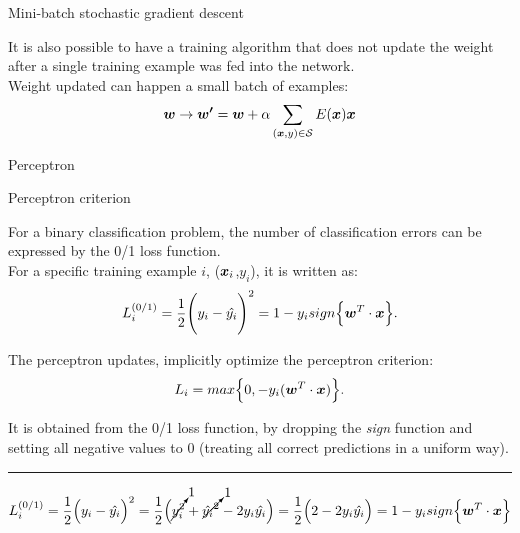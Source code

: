 \begin{frame}[t]{Mini-batch stochastic gradient descent}

    It is also possible to have a training algorithm that does not 
    update the weight after a single training example was fed into the network.\\

    Weight updated can happen a small batch of examples:
    \begin{equation}
        \boldsymbol{w} \rightarrow \boldsymbol{w^\prime} = 
          \boldsymbol{w} + \alpha \sum_{(\boldsymbol{x},y) \in \mathcal{S}} E(\boldsymbol{x}) \boldsymbol{x}
        \label{eq:percepton_weight_update_minibatch_1}
      \end{equation}

\end{frame}

%
%
%

\begin{frame}[t]{Perceptron}


\end{frame}

%
%
%

\begin{frame}[t]{Perceptron criterion}

    For a binary classification problem, 
    the number of classification errors can be expressed by the
    \gls{0/1 loss function}.\\
    \vspace{0.3cm}
    For a specific training example $i$, 
    ($\boldsymbol{x}_i$,$y_i$), it is written as:
    \begin{equation}
        L_{i}^{(0/1)} = 
          \frac{1}{2} \Bigg( y_i - \hat{y_i} \Bigg)^2 =
          1 - y_i sign\Big\{ \boldsymbol{w}^T \cdot \boldsymbol{x} \Big\}.
        \label{eq:percepton_01_loss_1}  
    \end{equation}

    The \gls{perceptron} updates, 
    implicitly optimize the \gls{perceptron criterion}:
    \begin{equation}
        L_{i} = 
          max\Big\{0, - y_i(\boldsymbol{w}^T \cdot \boldsymbol{x}) \Big\}.
        \label{eq:percepton_criterion_1}  
    \end{equation}

    It is obtained from the \gls{0/1 loss function}, 
    by dropping the {\em sign} function and setting all negative values to 0
    (treating all correct predictions in a uniform way).

    \noindent\rule{4cm}{0.4pt}
    {\scriptsize
        \begin{equation*}
            L_{i}^{(0/1)} = 
            \frac{1}{2} \Big( y_i - \hat{y_i} \Big)^2 =
            \frac{1}{2} \Big( \cancelto{1}{y_i^2} + \cancelto{1}{\hat{y_i}^2} - 2 y_i \hat{y_i} \Big) =          
            \frac{1}{2} \Big( 2 - 2 y_i \hat{y_i} \Big) = 
            1 - y_i sign\Big\{ \boldsymbol{w}^T \cdot \boldsymbol{x} \Big\}
        \end{equation*}     
    }
    
\end{frame}

